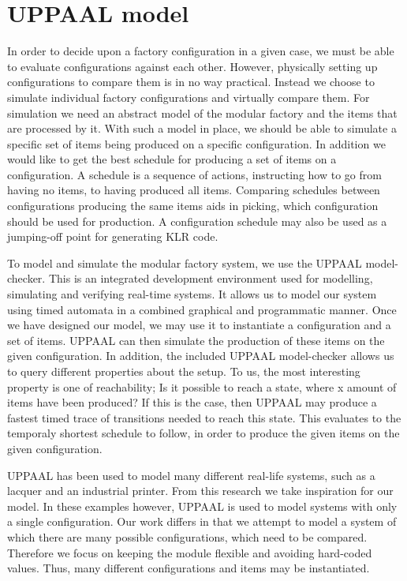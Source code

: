 \chapter{UPPAAL model}\label{ch:uppaalmodel}
In order to decide upon a factory configuration in a given case, we must be able to evaluate configurations against each other. However, physically setting up configurations to compare them is in no way practical. Instead we choose to simulate individual factory configurations and virtually compare them. For simulation we need an abstract model of the modular factory and the items that are processed by it. With such a model in place, we should be able to simulate a specific set of items being produced on a specific configuration. In addition we would like to get the best schedule for producing a set of items on a configuration. A schedule is a sequence of actions, instructing how to go from having no items, to having produced all items. Comparing schedules between configurations producing the same items aids in picking, which configuration should be used for production. A configuration schedule may also be used as a jumping-off point for generating KLR code.

To model and simulate the modular factory system, we use the UPPAAL model-checker\cite{Larsen97uppaalin}. This is an integrated development environment used for modelling, simulating and verifying real-time systems. It allows us to model our system using timed automata in a combined graphical and programmatic manner. Once we have designed our model, we may use it to instantiate a configuration and a set of items. UPPAAL can then simulate the production of these items on the given configuration. In addition, the included UPPAAL model-checker allows us to query different properties about the setup. To us, the most interesting property is one of reachability; Is it possible to reach a state, where x amount of items have been produced? If this is the case, then UPPAAL may produce a fastest timed trace of transitions needed to reach this state. This evaluates to the temporaly shortest schedule to follow, in order to produce the given items on the given configuration.

UPPAAL has been used to model many different real-life systems, such as a lacquer\cite{so54514} and an industrial printer\cite{Igna2008}. From this research we take inspiration for our model. In these examples however, UPPAAL is used to model systems with only a single configuration. Our work differs in that we attempt to model a system of which there are many possible configurations, which need to be compared. Therefore we focus on keeping the module flexible and avoiding hard-coded values. Thus, many different configurations and items may be instantiated.

